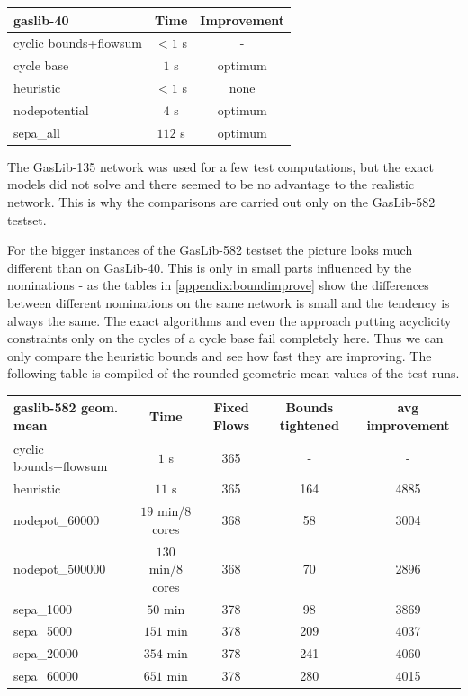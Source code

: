 \begin{center}

\begin{tabular}{ l | c | c }
\textbf{gaslib-40} & Time & Improvement\\
\hline
 cyclic bounds+flowsum& $<1$ s& - \\
 cycle base& $1$ s & optimum\\
 heuristic& $<1$ s& none\\
 nodepotential& $4$ s & optimum\\ 
 sepa\_all& $112$ s& optimum\\
\end{tabular} 
\end{center}

The GasLib-135 network was used for a few test computations, but the exact models did not solve and there seemed to be 
no advantage to the realistic network. This is why the comparisons are carried out only on the GasLib-582 testset.

For the bigger instances of the GasLib-582 testset the picture looks much different than on GasLib-40. This is only in 
small parts influenced by the nominations - as the tables in \ref{appendix:boundimprove} show the differences between 
different nominations on the same network is small and the tendency is always the same. The exact algorithms and even 
the approach putting acyclicity constraints only on the cycles of a cycle base fail completely here. Thus we can only 
compare the heuristic bounds and see how fast they are improving. The following table is compiled of the 
rounded geometric mean values of the test runs.

\begin{center}
\begin{tabular}{ l | c | c | c | c }
\textbf{gaslib-582 geom. mean} & Time  & Fixed Flows & Bounds tightened & avg improvement \\
\hline
 cyclic bounds+flowsum& $1$ s& 365 & - & -\\
 heuristic& $ 11$ s& 365& 164 & 4885 \\
 nodepot\_60000& $19$ min/8 cores & 368 &58  &  3004 \\ 
 nodepot\_500000& $130$ min/8 cores & 368 &70  & 2896 \\ 
 sepa\_1000& $ 50$ min & 378 & 98 & 3869 \\
 sepa\_5000& $ 151$ min & 378 & 209 & 4037 \\
 sepa\_20000& $ 354$ min & 378 & 241 & 4060 \\
 sepa\_60000& $ 651$ min  & 378& 280& 4015\\
\end{tabular} 
\end{center}

